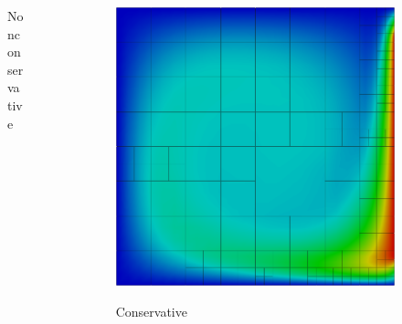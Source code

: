 \documentclass{beamer}
\begin{document}
\begin{frame}
{\begin{columns}
\begin{column}{0.49\textwidth}
\begin{figure}
Nonconservative
\end{figure}
\end{column}
\begin{column}{0.49\textwidth}
\begin{figure}
\centering
\includegraphics[width=1.0\textwidth]{DoubleGlazing/modified5c.png}

Conservative
\end{figure}
\end{column}
\end{columns}
}
\end{frame}

\end{document}
